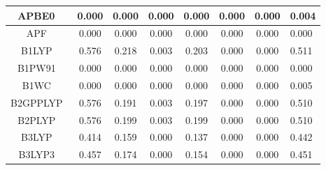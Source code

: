 \begin{tabular}{|c|c|c|c|c|c|c|l|}
                                     APBE0~\cite{Fabiano2015_122} &                0.000 &                          0.000 &             0.000 &                        0.000 &                0.000 &                0.000 &                       0.004 \\ \hline
                                       APF~\cite{Austin2012_4989} &                0.000 &                          0.000 &             0.000 &                        0.000 &                0.000 &                0.000 &                       0.000 \\ \hline
                                       B1LYP~\cite{Adamo1997_242} &                0.576 &                          0.218 &             0.003 &                        0.203 &                0.000 &                0.000 &                       0.511 \\ \hline
                                      B1PW91~\cite{Adamo1997_242} &                0.000 &                          0.000 &             0.000 &                        0.000 &                0.000 &                0.000 &                       0.000 \\ \hline
                                      B1WC~\cite{Bilc2008_165107} &                0.000 &                          0.000 &             0.000 &                        0.000 &                0.000 &                0.000 &                       0.005 \\ \hline
                                 B2GPPLYP~\cite{Karton2008_12868} &                0.576 &                          0.191 &             0.003 &                        0.197 &                0.000 &                0.000 &                       0.510 \\ \hline
                                  B2PLYP~\cite{Grimme2006_034108} &                0.576 &                          0.199 &             0.003 &                        0.199 &                0.000 &                0.000 &                       0.510 \\ \hline
                                  B3LYP~\cite{Stephens1994_11623} &                0.414 &                          0.159 &             0.000 &                        0.137 &                0.000 &                0.000 &                       0.442 \\ \hline
                                 B3LYP3~\cite{Stephens1994_11623} &                0.457 &                          0.174 &             0.000 &                        0.154 &                0.000 &                0.000 &                       0.451 \\ \hline

\end{tabular}
